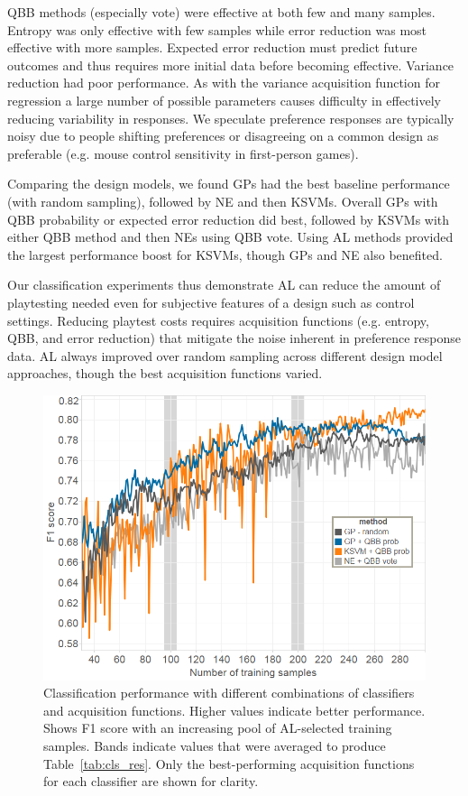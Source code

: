 \documentclass{sig-alternate}
\begin{document}
QBB methods (especially vote) were effective at both few and many samples.
Entropy was only effective with few samples while error reduction was most effective with more samples.
Expected error reduction must predict future outcomes and thus requires more initial data before becoming effective.
Variance reduction had poor performance.
As with the variance acquisition function for regression a large number of possible parameters causes difficulty in effectively reducing variability in responses.
We speculate preference responses are typically noisy due to people shifting preferences or disagreeing on a common design as preferable (e.g. mouse control sensitivity in first-person games).

Comparing the design models, we found GPs had the best baseline performance (with random sampling), followed by NE and then KSVMs.
Overall GPs with QBB probability or expected error reduction did best, followed by KSVMs with either QBB method and then NEs using QBB vote.
Using AL methods provided the largest performance boost for KSVMs, though GPs and NE also benefited.


Our classification experiments thus demonstrate AL can reduce the amount of playtesting needed even for subjective features of a design such as control settings.
Reducing playtest costs requires acquisition functions (e.g. entropy, QBB, and error reduction) that mitigate the noise inherent in preference response data.
AL always improved over random sampling across different design model approaches, though the best acquisition functions varied.


\begin{figure}[tb]
\centering
\includegraphics[width=\linewidth]{classification_experiment_happy}
\caption{Classification performance with different combinations of classifiers and acquisition functions.
Higher values indicate better performance.
Shows F1 score with an increasing pool of AL-selected training samples.
Bands indicate values that were averaged to produce Table~\ref{tab:cls_res}.
Only the best-performing acquisition functions for each classifier are shown for clarity.
}
\label{fig:cls_happy}
\end{figure}
\end{document}
